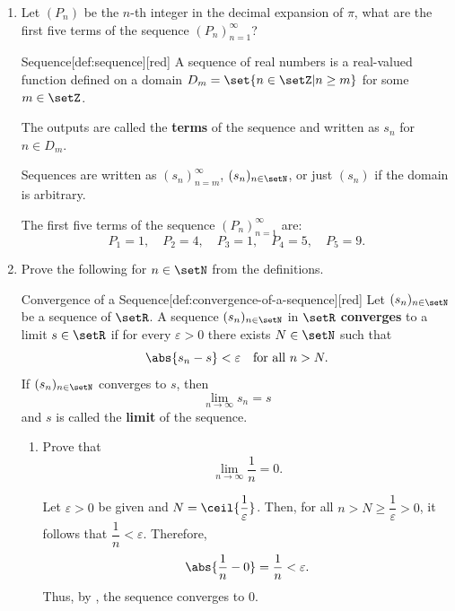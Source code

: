



\newpage





\begin{enumerate}
  \item Let \((P_n)\) be the $n$-th integer in the decimal expansion of \(\pi\), 
  what are the first five terms of the sequence \((P_n)_{n=1}^\infty\)?
  \begin{define}{Sequence}[def:sequence][red]
    A sequence of real numbers is a real-valued function
    defined on a domain \(D_m=\set{n\in\setZ | n \geq m}\) for some \(m \in \setZ\).

    The outputs are called the \textbf{terms} of the sequence and written as \(s_n\) for \(n \in D_m\).

    Sequences are written as \((s_n)_{n=m}^\infty\), \((s_n)_{n\in\setN}\), or just \((s_n)\)
    if the domain is arbitrary.
  \end{define}
  \begin{subanswer}
    The first five terms of the sequence \((P_n)_{n=1}^\infty\) are:
    \[
      P_1 = 1, \quad P_2 = 4, \quad P_3 = 1, \quad P_4 = 5, \quad P_5 = 9.
    \]
  \end{subanswer}
  \item Prove the following for \(n \in \setN\) from the definitions.
  \begin{define}{Convergence of a Sequence}[def:convergence-of-a-sequence][red]
    Let \((s_n)_{n\in\setN}\) be a sequence of \(\setR\).
    A sequence \((s_n)_{n\in\setN}\) in \(\setR\) \textbf{converges} to a limit \(s \in \setR\)
    if for every \(\varepsilon>0\) there exists \(N\in\setN\) such that 
    \[
      \abs{s_n - s} < \varepsilon \quad\text{for all } n > N.
    \]
    If \((s_n)_{n\in\setN}\) converges to \(s\), then
    \[
      \lim_{n\to\infty} s_n = s
    \]
    and $s$ is called the \textbf{limit} of the sequence.
  \end{define}
  \begin{enumerate}
    \item Prove that 
    \[
      \lim_{n\to\infty} \frac{1}{n} = 0.
    \]
    \begin{subprove}
      Let \(\varepsilon>0\) be given and 
      \(N=\ceil{\dfrac{1}{\varepsilon}}\).
      Then, for all \(n > N \ge \dfrac{1}{\varepsilon} > 0\), 
      it follows that \(\dfrac{1}{n} < \varepsilon\).
      Therefore,
      \[
        \abs{\frac{1}{n} - 0} = \frac{1}{n} < \varepsilon.
      \]
      Thus, by , the sequence converges to \(0\).
    \end{subprove}






\end{enumerate}
\end{enumerate}
